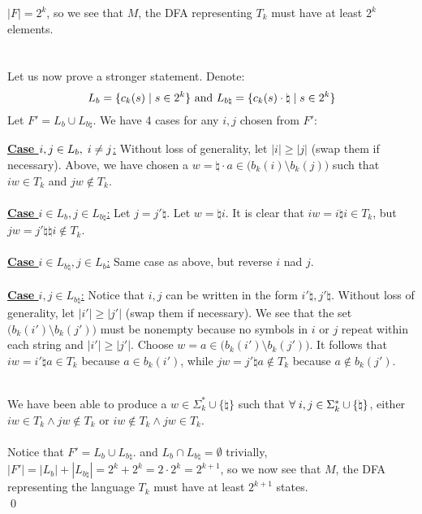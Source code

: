 \documentclass[11pt]{article}
\begin{document}
$|F|=2^k$, so we see that $M$, the DFA representing $T_k$ must have at least $2^k$ elements. \\ \\
\clearpage \ \\
Let us now prove a stronger statement. Denote:
\[L_b=\{c_k(s)\hspace{1mm}|\hspace{1mm}s\in 2^k\}\text{ and }L_{b\natural}=\{c_k(s)\cdot\natural\hspace{1mm}|\hspace{1mm}s\in 2^k\}\]
Let $F'=L_b\cup L_{b\natural}$. We have 4 cases for any $i,j$ chosen from $F'$: \\
\begin{addmargin}[2em]{0em}
	\underline{\textbf{Case $i,j\in L_b,\hspace{1mm}i\neq j$}:} Without loss of generality, let $|i|\geq|j|$ (swap them if necessary). Above, we have chosen a $w=\natural\cdot a\in\big(b_k(i)\setminus b_k(j)\big)$ such that $iw\in T_k$ and $jw\notin T_k$. \\ \\
	\underline{\textbf{Case $i\in L_b,j\in L_{b\natural}$}:} Let $j=j'\natural$. Let $w=\natural i$. It is clear that $iw=i\natural i\in T_k$, but $jw=j'\natural\natural i\notin T_k$. \\ \\
	\underline{\textbf{Case $i\in L_{b\natural},j\in L_b$}:} Same case as above, but reverse $i$ nad $j$. \\ \\
	\underline{\textbf{Case $i,j\in L_{b\natural}$}:} Notice that $i,j$ can be written in the form $i'\natural,j'\natural$. Without loss of generality, let $|i'|\geq|j'|$ (swap them if necessary). We see that the set $\big(b_k(i')\setminus b_k(j')\big)$ must be nonempty because no symbols in $i$ or $j$ repeat within each string and $|i'|\geq|j'|$. Choose $w=a\in\big(b_k(i')\setminus b_k(j')\big)$. It follows that $iw=i'\natural a\in T_k$ because $a\in b_k(i')$, while $jw=j'\natural a\notin T_k$ because $a\notin b_k(j')$.
\end{addmargin}
\ \\
We have been able to produce a $w\in\Sigma_k^*\cup\{\natural\}$ such that $\forall\hspace{1mm}i,j\in\Sigma_k^*\cup\{\natural\}$, either $iw\in T_k\wedge jw\notin T_k$ or $iw\notin T_k\wedge jw\in T_k$. \\ \\
Notice that $F'=L_b\cup L_{b\natural}$. and $L_b\cap L_{b\natural}=\emptyset$ trivially, $|F'|=|L_b|+|L_{b\natural}|=2^k+2^k=2\cdot 2^k=2^{k+1}$, so we now see that $M$, the DFA representing the language $T_k$ must have at least $2^{k+1}$ states. \\ \qed
\end{document}
